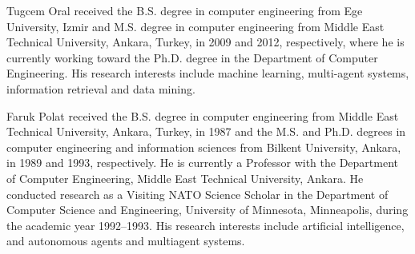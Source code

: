 \documentclass[10pt,journal]{IEEEtran}
\begin{document}
{}


\begin{IEEEbiography}{Tugcem Oral}
received the B.S. degree in computer engineering from Ege University, Izmir and M.S. degree in computer engineering from Middle East Technical
University, Ankara, Turkey, in 2009 and 2012, respectively, where he is currently working toward the Ph.D. degree in the Department of Computer Engineering. His research interests include machine learning, multi-agent systems, information retrieval and data mining.
\end{IEEEbiography}

\begin{IEEEbiography}{Faruk Polat}
received the B.S. degree in computer engineering from Middle East Technical University,
Ankara, Turkey, in 1987 and the M.S. and Ph.D. degrees in computer engineering and information sciences from Bilkent University, Ankara, in 1989 and 1993, respectively. He is currently a Professor with the Department of Computer Engineering, Middle East Technical University, Ankara. He conducted research as a Visiting NATO Science Scholar in the Department of Computer Science and Engineering, University of Minnesota, Minneapolis, during the academic year 1992--1993. His research interests include artificial intelligence, and autonomous agents and multiagent systems.
\end{IEEEbiography} 
\end{document}
